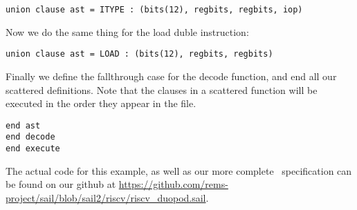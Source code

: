 \begin{lstlisting}
union clause ast = ITYPE : (bits(12), regbits, regbits, iop)
\end{lstlisting}

\sailfndecodeSomeITYPE
\sailfnexecuteITYPE

\noindent Now we do the same thing for the load duble instruction:

\begin{lstlisting}
union clause ast = LOAD : (bits(12), regbits, regbits)
\end{lstlisting}

\sailfndecodeSomeLOAD
\sailfnexecuteLOAD

Finally we define the fallthrough case for the decode function, and
end all our scattered definitions. Note that the clauses in a
scattered function will be executed in the order they appear in the
file.

\sailfndecodeNone

\begin{lstlisting}
end ast
end decode
end execute
\end{lstlisting}

The actual code for this example, as well as our more complete
\riscv\ specification can be found on our github at
\url{https://github.com/rems-project/sail/blob/sail2/riscv/riscv_duopod.sail}.
